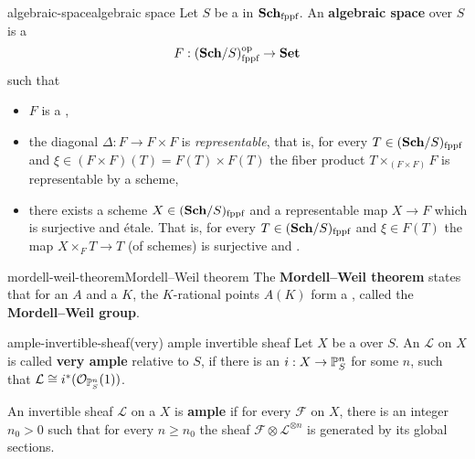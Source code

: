\begin{topic}{algebraic-space}{algebraic space}
    Let $S$ be a  in $\textbf{Sch}_\textup{fppf}$. An \textbf{algebraic space} over $S$ is a 
    \[ F : (\textbf{Sch}/S)_\textup{fppf}^\textup{op} \to \textbf{Set} \]
    such that
    \begin{itemize}
        \item $F$ is a ,
        \item the diagonal $\Delta : F \to F \times F$ is \textit{representable}, that is, for every $T \in (\textbf{Sch}/S)_\textup{fppf}$ and $\xi \in (F \times F)(T) = F(T) \times F(T)$ the fiber product $T \times_{(F \times F)} F$ is representable by a scheme,
        \item there exists a scheme $X \in (\textbf{Sch}/S)_\textup{fppf}$ and a representable map $X \to F$ which is surjective and étale. That is, for every $T \in (\textbf{Sch}/S)_\textup{fppf}$ and $\xi \in F(T)$ the map $X \times_F T \to T$ (of schemes) is surjective and .
    \end{itemize}
\end{topic}

\begin{topic}{mordell-weil-theorem}{Mordell--Weil theorem}
    The \textbf{Mordell--Weil theorem} states that for an  $A$ and a  $K$, the $K$-rational points $A(K)$ form a   , called the \textbf{Mordell--Weil group}.
\end{topic}

\begin{topic}{ample-invertible-sheaf}{(very) ample invertible sheaf}
    Let $X$ be a  over $S$. An  $\mathcal{L}$ on $X$ is called \textbf{very ample} relative to $S$, if there is an  $i : X \to \mathbb{P}_S^n$ for some $n$, such that $\mathcal{L} \cong i^*(\mathcal{O}_{\mathbb{P}_S^n}(1))$.
    
    An invertible sheaf $\mathcal{L}$ on a  $X$ is \textbf{ample} if for every  $\mathcal{F}$ on $X$, there is an integer $n_0 > 0$ such that for every $n \ge n_0$ the sheaf $\mathcal{F} \otimes \mathcal{L}^{\otimes n}$ is generated by its global sections.
\end{topic}

